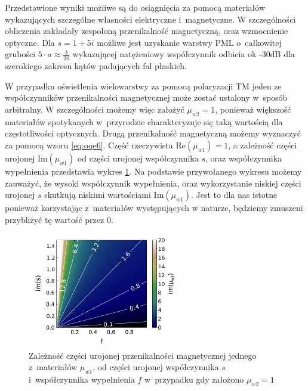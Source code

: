 Przedstawione wyniki możliwe są do osiągnięcia za pomocą materiałów wykazujących szczególne własności elektryczne i~magnetyczne. W szczególności obliczenia zakładały zespoloną przenikalność magnetyczną, oraz wzmocnienie optyczne. Dla $s=1+5i$ możliwe jest uzyskanie warstwy PML o~całkowitej grubości $5\cdot a \approx \frac{\lambda}{20}$ wykazującej natężeniowy współczynnik odbicia ok -30dB dla szerokiego zakresu kątów padających fal płaskich.

W przypadku oświetlenia wielowarstwy za pomocą polaryzacji TM jeden ze współczynników przenikalności magnetycznej może zostać ustalony w~sposób arbitralny. W szczególności możemy więc założyć $\mu_{w2}=1$, ponieważ większość materiałów spotykanych w~przyrodzie charakteryzuje się taką wartością dla częstotliwości optycznych. Drugą przenikalność magnetyczną możemy wyznaczyć za pomocą wzoru \ref{eq:oqe6}. Część rzeczywista $\textrm{Re}(\mu_{w1})=1$, a zależność części urojonej $\textrm{Im}(\mu_{w1})$ od części urojonej współczynnika $s$, oraz współczynnika wypełnienia przedstawia wykres \ref{fig:im-mu1}. Na podstawie przywołanego wykresu możemy zauważyć, że wysoki współczynnik wypełnienia, oraz wykorzystanie niskiej części urojonej $s$ skutkują niskimi wartościami $\textrm{Im}(\mu_{w1})$. Jest to dla nas istotne ponieważ korzystając z~materiałów występujących w naturze, będziemy zmuszeni przybliżyć tę wartość przez $0$.

\begin{figure}
	\includegraphics[width=0.6\textwidth]{images/pml/fig4.png}
	\caption{Zależność części urojonej przenikalności magnetycznej jednego z~materiałów $\mu_{w1}$, od części urojonej współczynnika $s$ i~współczynnika wypełnienia $f$ w~przypadku gdy założono $\mu_{w2}=1$}
	\label{fig:im-mu1}
\end{figure}


